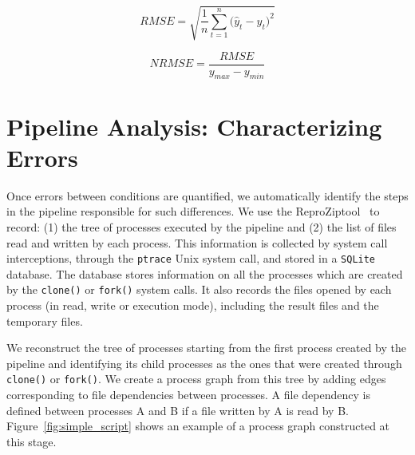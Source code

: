 \documentclass{article}
\newcommand{\reprozip}[0]{ReproZip}
\begin{document}
{\begin{center}
\begin{equation}
RMSE = {\sqrt {\frac{1} {n}{\sum\limits_{t = 1}^n {(\hat{y}_{t} - {y}_{t} } })^{2} } }
\end{equation}
\end{center}

\begin{center}
\begin{equation}
NRMSE = {\frac{RMSE} {y_{max} - y_{min}}}
\end{equation}
\end{center}

\section{Pipeline Analysis: Characterizing Errors}

Once errors between conditions are quantified, we automatically
identify the steps in the pipeline responsible for such differences.
We use the \reprozip tool~\cite{Chirigati2016} to record: (1) the tree of
processes executed by the pipeline and (2) the list of files read and
written by each process. This information is collected by system call
interceptions, through the \texttt{ptrace} Unix system call, and
stored in a \texttt{SQLite} database. The database stores information
on all the processes which are created by the \texttt{clone()} or
\texttt{fork()} system calls. It also records the files opened by each
process (in read, write or execution mode), including the result files
and the temporary files.

We reconstruct the tree of processes starting from the first process 
created by the pipeline and identifying its child processes as the ones 
that were created through \texttt{clone()} or \texttt{fork()}. We 
create a process graph from this tree by adding edges corresponding to 
file dependencies between processes. A file dependency is defined 
between processes A and B if a file written by A is read by B. 
Figure~\ref{fig:simple_script} shows an example of a process graph 
constructed at this stage.

}
\end{document}
